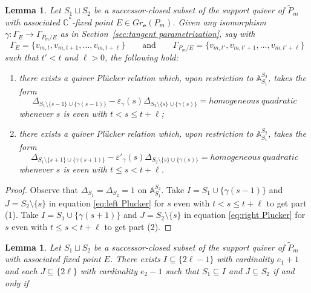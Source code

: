 \documentclass{amsart}
\newtheorem{lemma}[theorem]{Lemma}
\numberwithin{equation}{section}
\renewcommand{\AA}{\mathbb{A}}
\newcommand{\CC}{\mathbb{C}}
\newcommand{\bfe}{\mathbf{e}}
\begin{document}
  \begin{lemma}
    Let $S_1\sqcup S_2$ be a successor-closed subset of the support quiver of $\tilde P_m$ with associated $\CC^*$-fixed point $E\in Gr_\bfe(P_m)$.
    Given any isomorphism $\gamma:\Gamma_E\to\Gamma_{P_m/E}$ as in Section~\ref{sec:tangent parametrization}, say with
    \[\Gamma_E=\{v_{m,t},v_{m,t+1},\ldots,v_{m,t+\ell}\}\qquad\text{and}\qquad\Gamma_{P_m/E}=\{v_{m,t'},v_{m,t'+1},\ldots,v_{m,t'+\ell}\}\]
    such that $t'<t$ and $\ell>0$, the following hold:
    \begin{enumerate}
      \item there exists a quiver Pl\"ucker relation which, upon restriction to $\AA_{S_1}^{S_2}$, takes the form
        \[\Delta_{S_1\setminus\{s-1\}\cup\{\gamma(s-1)\}}-\varepsilon_\gamma(s)\Delta_{S_2\setminus\{s\}\cup\{\gamma(s)\}}=homogeneous~quadratic\]
        whenever $s$ is even with $t<s\le t+\ell$;
      \item there exists a quiver Pl\"ucker relation which, upon restriction to $\AA_{S_1}^{S_2}$, takes the form
        \[\Delta_{S_1\setminus\{s+1\}\cup\{\gamma(s+1)\}}-\varepsilon'_\gamma(s)\Delta_{S_2\setminus\{s\}\cup\{\gamma(s)\}}=homogeneous~quadratic\]
        whenever $s$ is even with $t\le s<t+\ell$.
    \end{enumerate}
  \end{lemma}
  \begin{proof}
    Observe that $\Delta_{S_1}=\Delta_{S_2}=1$ on $\AA_{S_1}^{S_2}$.
    Take $I=S_1\cup\{\gamma(s-1)\}$ and $J=S_2\setminus\{s\}$ in equation \eqref{eq:left Plucker} for $s$ even with $t<s\le t+\ell$ to get part (1).
    Take $I=S_1\cup\{\gamma(s+1)\}$ and $J=S_2\setminus\{s\}$ in equation \eqref{eq:right Plucker} for $s$ even with $t\le s<t+\ell$ to get part (2).
  \end{proof}

  \begin{lemma}
    Let $S_1\sqcup S_2$ be a successor-closed subset of the support quiver of $\tilde P_m$ with associated fixed point $E$.
    There exists $I\subseteq\{2\ell-1\}$ with cardinality $e_1+1$ and each $J\subseteq\{2\ell\}$ with cardinality $e_2-1$ such that $S_1\subseteq I$ and $J\subseteq S_2$ if and only if
  \end{lemma}
\end{document}
